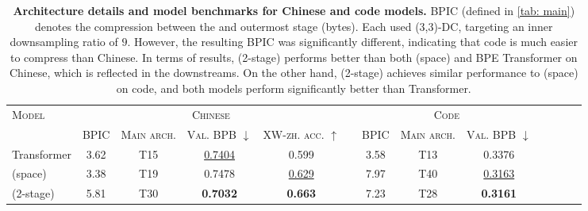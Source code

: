 \begin{table}[t!]
\caption{
\textbf{Architecture details and model benchmarks for Chinese and code models.}
BPIC (defined in \cref{tab: main}) denotes the compression between the \main{} and outermost stage (bytes).
Each \model{} used (3,3)-DC, targeting an inner downsampling ratio of $9$.
However, the resulting BPIC was significantly different, indicating that code is much easier to compress than Chinese.
In terms of results, \model{} (2-stage) performs better than both \model{} (space) and BPE Transformer on Chinese, which is reflected in the downstreams.
On the other hand, \model{} (2-stage) achieves similar performance to \model{} (space) on code, and both \model{} models perform significantly better than Transformer.
}

\centering
\small

\begin{tabular}{lcccccccccccc}
\toprule
\multirow{2}{*}{\textsc{Model}}  & \multicolumn{4}{c}{\textsc{Chinese}}                                                  & & \multicolumn{3}{c}{\textsc{Code}} \\
\cmidrule{2-5}
\cmidrule{7-9}
                        & \textsc{BPIC}  & \textsc{Main arch.}            & \textsc{Val. BPB} $\downarrow$ & \textsc{XW-zh. acc.} $\uparrow$      &  & \textsc{BPIC} & \textsc{Main arch.}             & \textsc{Val. BPB} $\downarrow$ \\
\midrule
Transformer             & 3.62  & \colorbox{Main}{T15}  & \underline{0.7404}                & 0.599                       &  & 3.58 & \colorbox{Main}{T13}   & 0.3376                \\
\model{} (space)        & 3.38  & \colorbox{Main}{T19}  & 0.7478                & \underline{0.629}                       &  & 7.97 & \colorbox{Main}{T40}   & \underline{0.3163}                \\
\model{} (2-stage)      & 5.81  & \colorbox{Main}{T30}  & \textbf{0.7032}                & \textbf{0.663}                       &  & 7.23 & \colorbox{Main}{T28}   & \textbf{0.3161}                \\
\bottomrule
\end{tabular}
\label{tab: cd-supp}
\end{table}